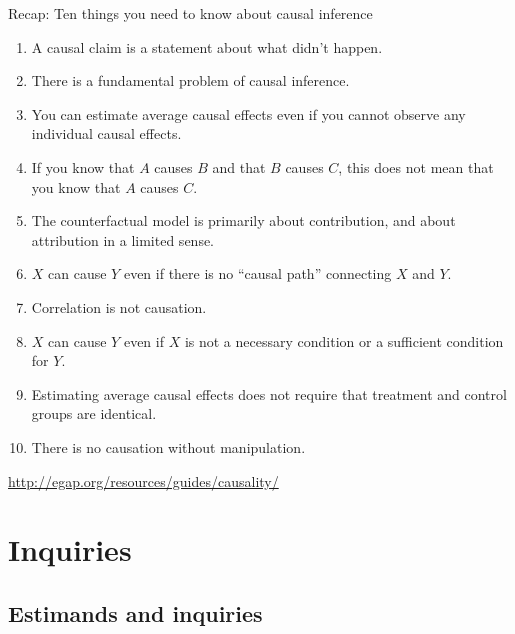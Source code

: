 \documentclass[
  11pt,
  ignorenonframetext,
]{beamer}
\providecommand{\tightlist}{%
  \setlength{\itemsep}{0pt}\setlength{\parskip}{0pt}}\usepackage{longtable,booktabs,array}
\begin{document}
\begin{frame}{Recap: Ten things you need to know about causal inference}
\protect\hypertarget{recap-ten-things-you-need-to-know-about-causal-inference}{}
\begin{enumerate}
\tightlist
\item
  A causal claim is a statement about what didn't happen.
\item
  There is a fundamental problem of causal inference.
\item
  You can estimate average causal effects even if you cannot observe any
  individual causal effects.
\item
  If you know that \(A\) causes \(B\) and that \(B\) causes \(C\), this
  does not mean that you know that \(A\) causes \(C\).
\item
  The counterfactual model is primarily about contribution, and about
  attribution in a limited sense.
\item
  \(X\) can cause \(Y\) even if there is no ``causal path'' connecting
  \(X\) and \(Y\).
\item
  Correlation is not causation.
\item
  \(X\) can cause \(Y\) even if \(X\) is not a necessary condition or a
  sufficient condition for \(Y\).
\item
  Estimating average causal effects does not require that treatment and
  control groups are identical.
\item
  There is no causation without manipulation.
\end{enumerate}

\url{http://egap.org/resources/guides/causality/}
\end{frame}

\hypertarget{inquiries-2}{%
\section{\texorpdfstring{Inquiries
\label{estimands}}{Inquiries }}\label{inquiries-2}}

\hypertarget{estimands-and-inquiries}{%
\subsection{Estimands and inquiries}\label{estimands-and-inquiries}}
\end{document}
